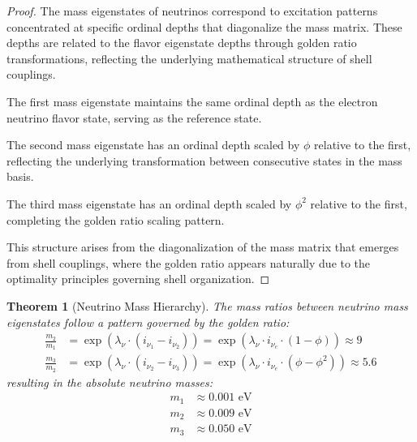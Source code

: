 \documentclass[12pt,a4paper]{article}
\newtheorem{theorem}{Theorem}[section]
\begin{document}
\begin{proof}
The mass eigenstates of neutrinos correspond to excitation patterns concentrated at specific ordinal depths that diagonalize the mass matrix. These depths are related to the flavor eigenstate depths through golden ratio transformations, reflecting the underlying mathematical structure of shell couplings.

The first mass eigenstate maintains the same ordinal depth as the electron neutrino flavor state, serving as the reference state.

The second mass eigenstate has an ordinal depth scaled by $\phi$ relative to the first, reflecting the underlying transformation between consecutive states in the mass basis.

The third mass eigenstate has an ordinal depth scaled by $\phi^2$ relative to the first, completing the golden ratio scaling pattern.

This structure arises from the diagonalization of the mass matrix that emerges from shell couplings, where the golden ratio appears naturally due to the optimality principles governing shell organization.
\end{proof}

\begin{theorem}[Neutrino Mass Hierarchy]
\label{thm:mass-hierarchy}
The mass ratios between neutrino mass eigenstates follow a pattern governed by the golden ratio:
\begin{align}
\frac{m_2}{m_1} &= \exp\left(\lambda_{\nu} \cdot (i_{\nu_1} - i_{\nu_2})\right) = \exp\left(\lambda_{\nu} \cdot i_{\nu_e} \cdot (1 - \phi)\right) \approx 9 \\
\frac{m_3}{m_2} &= \exp\left(\lambda_{\nu} \cdot (i_{\nu_2} - i_{\nu_3})\right) = \exp\left(\lambda_{\nu} \cdot i_{\nu_e} \cdot (\phi - \phi^2)\right) \approx 5.6
\end{align}
resulting in the absolute neutrino masses:
\begin{align}
m_1 &\approx 0.001 \text{ eV} \\
m_2 &\approx 0.009 \text{ eV} \\
m_3 &\approx 0.050 \text{ eV}
\end{align}
\end{theorem}
\end{document}
